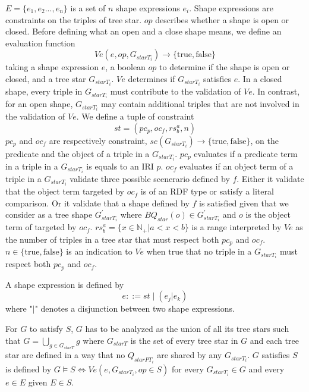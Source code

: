 $E = \{e_1, e_2 ..., e_{n}\}$ is a set of $n$ shape expressions $e_i$.
Shape expressions are constraints on the triples of tree star.
$op$ describes whether a shape is open or closed.
Before defining what an open and a close shape means, we define an evaluation function 
\begin{equation}
    Ve(e, op, G_{starT_i}) \rightarrow \{\mathrm{true}, \mathrm{false} \}
\end{equation}
taking a shape expression $e$, a boolean $op$ to determine if the shape is open or closed, and a tree star $G_{starT_i}$.
$Ve$ determines if $G_{starT_i}$ satisfies $e$.
In a closed shape, every triple in $G_{starT_i}$ must contribute to the validation of $Ve$.
In contrast, for an open shape, $G_{starT_i}$ may contain additional triples that are not involved in the validation of $Ve$.
We define a tuple of constraint
\begin{equation}
    st = (pc_p, oc_f, rs^a_b, n)
\end{equation}
$pc_p$ and $oc_f$ are respectively constraint,
$sc(G_{starT_i})  \rightarrow \{\mathrm{true}, \mathrm{false}\}$,
on the predicate and the object of a triple in a $G_{starT_i}$.
$pc_p$ evaluates if a predicate term in a triple in a $G_{starT_i}$ is equals to an IRI $p$.
$oc_f$ evaluates if an object term of a triple in a $G_{starT_i}$ validate three possible scenerario defined by $f$.
Either it validate that the object term targeted by $oc_f$ is of an RDF type or satisfy a literal comparison.
Or it validate that a shape defined by $f$ is satisfied given that we consider as a tree shape 
$G_{starT_i}^{\prime}$ where $BQ_{star}(o) \in G_{starT_i}^{\prime}$ and $o$ is the object term of targeted by $oc_f$.
$rs^a_b = \{x \in \mathbb{N}_+ | a < x < b \}$ is a range interpreted by $Ve$ as the number of triples in a tree star that must respect both $pc_p$ and $oc_f$.
$n \in \{\mathrm{true}, \mathrm{false}\}$ is an indication to $Ve$ when $\mathrm{true}$ that no triple in a $G_{starT_i}$ must respect both $pc_p$ and $oc_f$. 

A shape expression is defined by
\begin{equation}
 e ::= st \mid (e_j|e_k)
\end{equation}
where "$|$" denotes a disjunction between two shape expressions.

For $G$ to satisfy $S$, $G$ has to be analyzed as the union of all its tree stars such that $G = \bigcup_{g \in G_{starT}} g$ where $G_{starT}$ is the set of every tree star in $G$
and each tree star are defined in a way that no $Q_{starPT_i}$ are shared by any $G_{starT_i}$.
$G$ satisfies $S$ is defined by $G \models S \iff Ve(e,G_{starT_i}, op\in S)$  for every $G_{starT_i} \in G$ and every $e \in E$ given $E \in S$.

